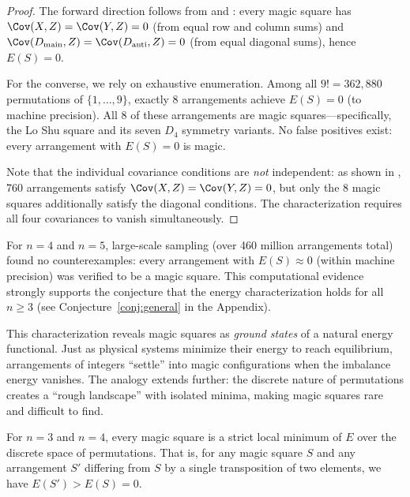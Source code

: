 \begin{proof}
The forward direction follows from  and :
every magic square has $\Cov(X, Z) = \Cov(Y, Z) = 0$ (from equal row and column sums)
and $\Cov(D_{\mathrm{main}}, Z) = \Cov(D_{\mathrm{anti}}, Z) = 0$ (from equal diagonal sums),
hence $E(S) = 0$.

For the converse, we rely on exhaustive enumeration.
Among all $9! = 362{,}880$ permutations of $\{1, \ldots, 9\}$, exactly 8 arrangements 
achieve $E(S) = 0$ (to machine precision).
All 8 of these arrangements are magic squares---specifically, the Lo Shu square 
and its seven $D_4$ symmetry variants.
No false positives exist: every arrangement with $E(S) = 0$ is magic.

Note that the individual covariance conditions are \emph{not} independent:
as shown in , 760 arrangements satisfy $\Cov(X, Z) = \Cov(Y, Z) = 0$,
but only the 8 magic squares additionally satisfy the diagonal conditions.
The characterization requires all four covariances to vanish simultaneously.
\end{proof}

For $n = 4$ and $n = 5$, large-scale sampling (over 460 million arrangements total) 
found no counterexamples: every arrangement with $E(S) \approx 0$ (within machine precision)
was verified to be a magic square.
This computational evidence strongly supports the conjecture that the energy characterization 
holds for all $n \geq 3$ (see Conjecture~\ref{conj:general} in the Appendix).

This characterization reveals magic squares as \emph{ground states} of a natural energy functional.
Just as physical systems minimize their energy to reach equilibrium,
arrangements of integers ``settle'' into magic configurations when the imbalance energy vanishes.
The analogy extends further: the discrete nature of permutations creates a ``rough landscape'' 
with isolated minima, making magic squares rare and difficult to find.

\begin{proposition}
\label{prop:isolation}
For $n = 3$ and $n = 4$, every magic square is a strict local minimum of $E$ 
over the discrete space of permutations.
That is, for any magic square $S$ and any arrangement $S'$ differing from $S$ 
by a single transposition of two elements, we have $E(S') > E(S) = 0$.
\end{proposition}

